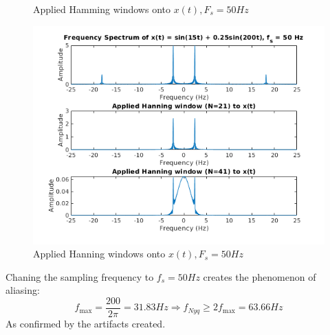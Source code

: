 \documentclass[12pt, a4paper]{article}
\begin{document}
\begin{enumerate}
\begin{figure}[H]
        \caption{Applied Hamming windows onto \(x(t), F_s = 50Hz\)}
    \end{figure}
    \begin{figure}[H]
        \centering
        \includegraphics[scale=0.9]{hann_sig_50.png}
        \caption{Applied Hanning windows onto \(x(t), F_s = 50Hz\) }
    \end{figure}
    Chaning the sampling frequency to \(f_s = 50Hz\) creates the phenomenon of aliasing:
    \[f_{\max} = \frac{200}{2\pi} = 31.83 Hz \Rightarrow f_{Nyq} \ge 2f_{\max} = 63.66Hz\]
    As confirmed by the artifacts created.
\end{enumerate}
\end{document}
